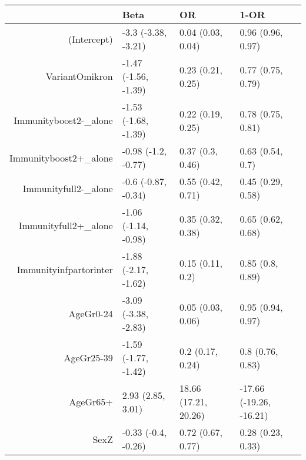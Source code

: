 \begin{table}[ht]
\centering
\begin{tabular}{rlll}
  \hline
 & Beta & OR & 1-OR \\ 
  \hline
(Intercept) & -3.3 (-3.38, -3.21) & 0.04 (0.03, 0.04) & 0.96 (0.96, 0.97) \\ 
  VariantOmikron & -1.47 (-1.56, -1.39) & 0.23 (0.21, 0.25) & 0.77 (0.75, 0.79) \\ 
  Immunityboost2-\_alone & -1.53 (-1.68, -1.39) & 0.22 (0.19, 0.25) & 0.78 (0.75, 0.81) \\ 
  Immunityboost2+\_alone & -0.98 (-1.2, -0.77) & 0.37 (0.3, 0.46) & 0.63 (0.54, 0.7) \\ 
  Immunityfull2-\_alone & -0.6 (-0.87, -0.34) & 0.55 (0.42, 0.71) & 0.45 (0.29, 0.58) \\ 
  Immunityfull2+\_alone & -1.06 (-1.14, -0.98) & 0.35 (0.32, 0.38) & 0.65 (0.62, 0.68) \\ 
  Immunityinfpartorinter & -1.88 (-2.17, -1.62) & 0.15 (0.11, 0.2) & 0.85 (0.8, 0.89) \\ 
  AgeGr0-24 & -3.09 (-3.38, -2.83) & 0.05 (0.03, 0.06) & 0.95 (0.94, 0.97) \\ 
  AgeGr25-39 & -1.59 (-1.77, -1.42) & 0.2 (0.17, 0.24) & 0.8 (0.76, 0.83) \\ 
  AgeGr65+ & 2.93 (2.85, 3.01) & 18.66 (17.21, 20.26) & -17.66 (-19.26, -16.21) \\ 
  SexZ & -0.33 (-0.4, -0.26) & 0.72 (0.67, 0.77) & 0.28 (0.23, 0.33) \\ 
   \hline
\end{tabular}
\end{table}

